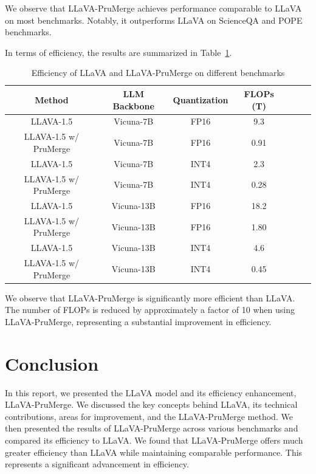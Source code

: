 \documentclass[onecolumn]{IEEEtran}
\begin{document}
We observe that LLaVA-PruMerge achieves performance comparable to LLaVA on most benchmarks. Notably, it outperforms LLaVA on ScienceQA and POPE benchmarks.  

In terms of efficiency, the results are summarized in Table~\ref{tab:prumerge-efficiency}.

\begin{table}[H]
    \centering
    \begin{tabular}{|c|c|c|c|c|c|c|}
        \hline
        Method & LLM Backbone & Quantization & FLOPs (T) \\
        \hline
        LLAVA-1.5 & Vicuna-7B & FP16 & 9.3 \\
        LLAVA-1.5 w/ PruMerge & Vicuna-7B & FP16 & 0.91 \\
        LLAVA-1.5 & Vicuna-7B & INT4 & 2.3  \\
        LLAVA-1.5 w/ PruMerge & Vicuna-7B & INT4 & 0.28 \\
        LLAVA-1.5 & Vicuna-13B & FP16 & 18.2  \\
        LLAVA-1.5 w/ PruMerge & Vicuna-13B & FP16 & 1.80 \\
        LLAVA-1.5 & Vicuna-13B & INT4 & 4.6   \\
        LLAVA-1.5 w/ PruMerge & Vicuna-13B & INT4 & 0.45 \\
        \hline
    \end{tabular}
    \caption{Efficiency of LLaVA and LLaVA-PruMerge on different benchmarks \cite{shang2024LLaVA-PruMerge}}
    \label{tab:prumerge-efficiency}
\end{table}
We observe that LLaVA-PruMerge is significantly more efficient than LLaVA. The number of FLOPs is reduced by approximately a factor of 10 when using LLaVA-PruMerge, representing a substantial improvement in efficiency.

\section{Conclusion}
In this report, we presented the LLaVA model and its efficiency enhancement, LLaVA-PruMerge. We discussed the key concepts behind LLaVA, its technical contributions, areas for improvement, and the LLaVA-PruMerge method. We then presented the results of LLaVA-PruMerge across various benchmarks and compared its efficiency to LLaVA. We found that LLaVA-PruMerge offers much greater efficiency than LLaVA while maintaining comparable performance. This represents a significant advancement in efficiency.
\end{document}

